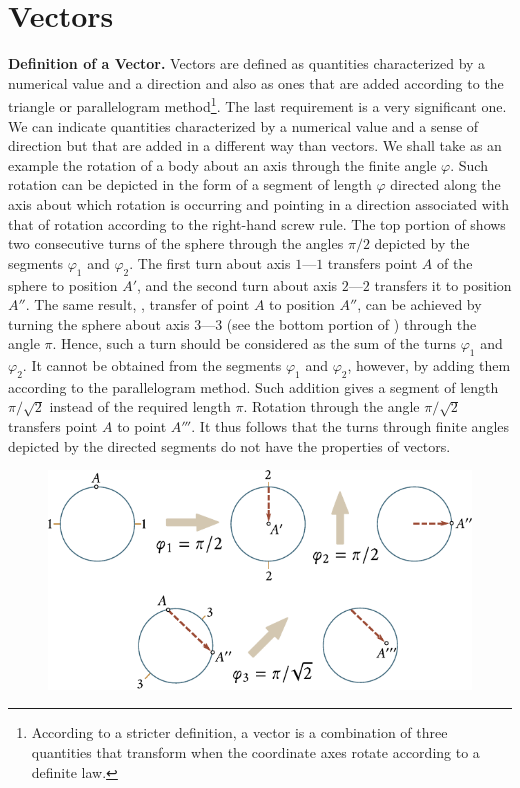 \section{Vectors}\label{sec:1_2}

\textbf{Definition of a Vector.} Vectors are defined as quantities characterized by a numerical value and a direction and also as ones that are added according to the triangle or parallelogram method\footnote{According to a stricter definition, a vector is a combination of three quantities that transform when the coordinate axes rotate according to a definite law.}. The last requirement is a very significant one. We can indicate quantities characterized by a numerical value and a sense of direction but that are added in a different way than vectors. We shall take as an example the rotation of a body about an axis through the finite angle $\varphi$. Such rotation can be depicted in the form of a segment of length $\varphi$ directed along the axis about which rotation is occurring and pointing in a direction associated with that of rotation according to the right-hand screw rule. The top portion of  shows two consecutive turns of the sphere through the angles $\pi/2$ depicted by the segments $\varphi_1$ and $\varphi_2$. The first turn about axis $1$---$1$ transfers point $A$ of the sphere to position $A'$, and the second turn about axis $2$---$2$ transfers it to position $A''$. The same result, \ie, transfer of point $A$ to position $A''$, can be achieved by turning the sphere about axis $3$---$3$ (see the bottom portion of ) through the angle $\pi$. Hence, such a turn should be considered as the sum of the turns $\varphi_1$ and $\varphi_2$. It cannot be obtained from the segments $\varphi_1$ and $\varphi_2$, however, by adding them according to the parallelogram method. Such addition gives a segment of length $\pi/\sqrt{2}$ instead of the required length $\pi$. Rotation through the angle $\pi/\sqrt{2}$ transfers point $A$ to point $A'''$. It thus follows that the turns through finite angles depicted by the directed segments do not have the properties of vectors.

\begin{figure}[t]
	\begin{center}
		\includegraphics[scale=0.9]{figures/ch_01/fig_1_4.pdf}
		\caption[]{}
		\label{fig:1_4}
	\end{center}
\vspace{-0.8cm}
\end{figure}

